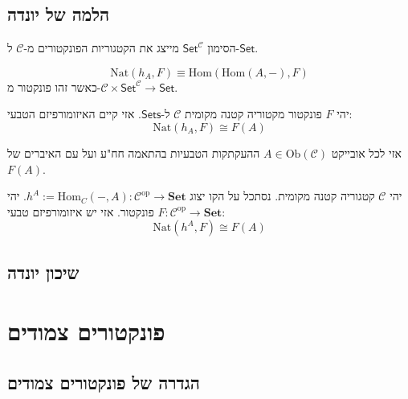 \documentclass{tstextbook}
\begin{document}
\section{הלמה של יונדה}

\begin{reminder}
הסימון \(\mathsf{Set}^{\mathcal{C}}\) מייצג את הקטגוריות הפונקטורים מ-\(\mathcal{C}\) ל-\(\mathsf{Set}\).

\end{reminder}
\begin{definition}
$$\mathrm{{Nat}}(h_{A},F)\equiv\mathrm{{Hom}}(\mathrm{{Hom}}(A,-),F)$$
כאשר זהו פונקטור מ-\(\mathcal{C}\times \mathsf{Set}^{\mathcal{C}}\to\mathsf{Set}\).

\end{definition}
\begin{proposition}
יהי \(F\) פונקטור מקטוריה קטנה מקומית \(\mathcal{C}\) ל-\(\mathsf{Sets}\). אזי קיים האיזומורפיזם הטבעי:
$$\mathrm{Nat}(h_{A},F)\cong F(A)$$

\end{proposition}
אזי לכל אובייקט \(A \in \mathrm{Ob}\left( \mathcal{C} \right)\) ההעקתקות הטבעיות  בהתאמה חח"ע ועל עם האיברים של \(F(A)\).

\begin{proposition}
יהי \(\mathcal{C}\) קטגוריה קטנה מקומית. נסתכל על הקו יצוג \(h^{A}:=\mathrm{Hom}_{C}(-,A):{\mathcal C}^{\mathrm{op}}\to\mathbf{Set}\). יהי \(F: \mathcal{C}^{\mathrm{op}} \to \mathbf{Set}\) פונקטור. אזי יש איזומורפיזם טבעי:
$$\mathrm{Nat}(h^{A},F)\cong F(A)$$

\end{proposition}
\section{שיכון יונדה}

\chapter{פונקטורים צמודים}

\section{הגדרה של פונקטורים צמודים}
\end{document}

